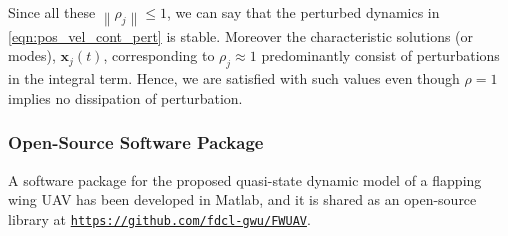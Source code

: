 \documentclass[10pt]{article}
\newcommand{\norm}[1]{\ensuremath{\left\| #1 \right\|}}
\begin{document}
Since all these $ \norm{\rho_j} \le 1 $, we can say that the perturbed dynamics in \eqref{eqn:pos_vel_cont_pert} is stable. Moreover the characteristic solutions (or modes), $ \mathbf{x}_j(t) $, corresponding to $ \rho_j \approx 1 $ predominantly consist of perturbations in the integral term. Hence, we are satisfied with such values even though $ \rho = 1 $ implies no dissipation of perturbation.


\subsubsection*{Open-Source Software Package}

A software package for the proposed quasi-state dynamic model of a flapping wing UAV has been developed in Matlab, and it is shared as an open-source library at \href{https://github.com/fdcl-gwu/FWUAV}{\texttt{https://github.com/fdcl-gwu/FWUAV}}.
\end{document}
